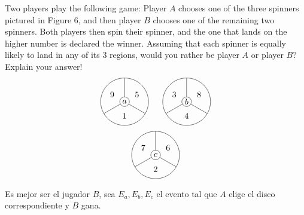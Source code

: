 \item Two players play the following game: Player $A$ chooses one of the three spinners pictured in Figure 6, and then player $B$ chooses one of the remaining two spinners. Both players then spin their spinner, and the one that lands on the higher number is declared the winner. Assuming that each spinner is equally likely to land in any of its 3 regions, would you rather be player $A$ or player $B$? Explain your answer!
\[
\begin{tikzpicture}
    \def \radius {1.5}
    \begin{scope}[shift={(150:\radius)}]
        \draw (0, 0) circle (1);
        \draw (0, 0) circle (0.2);
        \node at (0, 0) {$a$};
        \foreach \lineangle/\lblangle/\lbl in {90/150/9, 210/270/1, 330/30/5} {
            \draw (0, 0) +(\lineangle:.2) -- +(\lineangle:1);
            \path (0, 0) ++(\lblangle:.6) node {\lbl};
        }
    \end{scope}
    
    \begin{scope}[shift={(270:\radius)}]
        \draw (0, 0) circle (1);
        \draw (0, 0) circle (0.2);
        \node at (0, 0) {$c$};
        \foreach \lineangle/\lblangle/\lbl in {90/150/7, 210/270/2, 330/30/6} {
            \draw (0, 0) +(\lineangle:.2) -- +(\lineangle:1);
            \path (0, 0) ++(\lblangle:.6) node {\lbl};
        }
    \end{scope}

    \begin{scope}[shift={( 30:\radius)}]
        \draw (0, 0) circle (1);
        \draw (0, 0) circle (0.2);
        \node at (0, 0) {$b$};
        \foreach \lineangle/\lblangle/\lbl in {90/150/3, 210/270/4, 330/30/8} {
            \draw (0, 0) +(\lineangle:.2) -- +(\lineangle:1);
            \path (0, 0) ++(\lblangle:.6) node {\lbl};
        }
    \end{scope}
\end{tikzpicture}
\]

Es mejor ser el jugador $B$, sea $E_a, E_b, E_c$ el evento tal que $A$ elige el disco correspondiente y $B$ gana.

